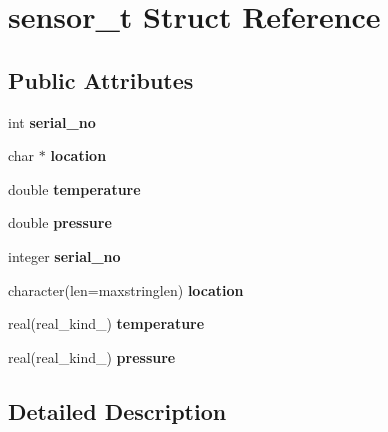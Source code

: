 \hypertarget{structsensor__t}{}\section{sensor\+\_\+t Struct Reference}
\label{structsensor__t}
\subsection*{Public Attributes}
\begin{DoxyCompactItemize}
\item 
\mbox{\label{structsensor__t_a801c7f484b162287891afea2a0de7969}} 
int {\bfseries serial\+\_\+no}
\item 
\mbox{\label{structsensor__t_a715329befd8a0f4b1d7bc4c5d262591b}} 
char $\ast$ {\bfseries location}
\item 
\mbox{\label{structsensor__t_a1e991d9877797400a7553aecb2cdb0f6}} 
double {\bfseries temperature}
\item 
\mbox{\label{structsensor__t_a329a894129f23af30dae115a32662fbf}} 
double {\bfseries pressure}
\item 
\mbox{\label{structsensor__t_a801c7f484b162287891afea2a0de7969}} 
integer {\bfseries serial\+\_\+no}
\item 
\mbox{\label{structsensor__t_a40b30a774257250c5a69b277dd34169d}} 
character(len=maxstringlen) {\bfseries location}
\item 
\mbox{\label{structsensor__t_ad0a4d0ca6aea06d3282d74a2d1150afa}} 
real(real\+\_\+kind\+\_) {\bfseries temperature}
\item 
\mbox{\label{structsensor__t_aa21a7068eb6dd25c2636a9b91e71c54a}} 
real(real\+\_\+kind\+\_) {\bfseries pressure}
\end{DoxyCompactItemize}


\subsection{Detailed Description}


